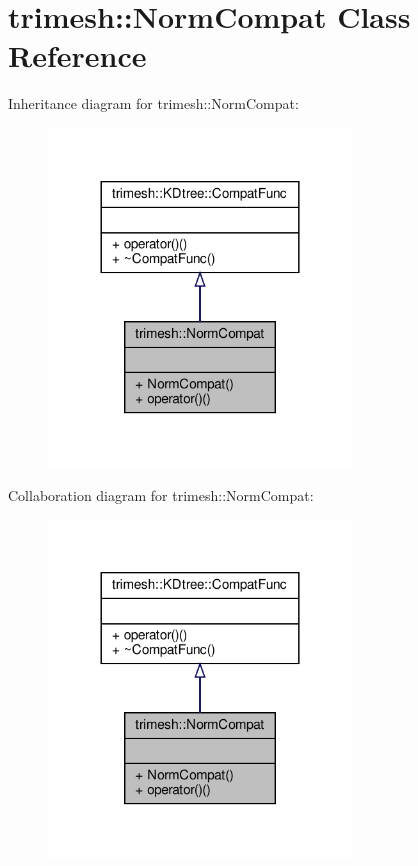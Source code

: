\hypertarget{classtrimesh_1_1NormCompat}{}\section{trimesh\+:\+:Norm\+Compat Class Reference}
\label{classtrimesh_1_1NormCompat}


Inheritance diagram for trimesh\+:\+:Norm\+Compat\+:\nopagebreak
\begin{figure}[H]
\begin{center}
\leavevmode
\includegraphics[width=228pt]{dd/d65/classtrimesh_1_1NormCompat__inherit__graph}
\end{center}
\end{figure}


Collaboration diagram for trimesh\+:\+:Norm\+Compat\+:\nopagebreak
\begin{figure}[H]
\begin{center}
\leavevmode
\includegraphics[width=228pt]{d9/df6/classtrimesh_1_1NormCompat__coll__graph}
\end{center}
\end{figure}
